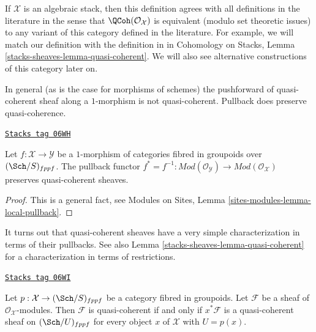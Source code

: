 If $\mathcal{X}$ is an algebraic stack, then this definition agrees with all
definitions in the literature in the sense that $\QCoh(\mathcal{O}_\mathcal{X})$
is equivalent (modulo set theoretic issues) to any variant of this category
defined in the literature. For example, we will match our definition with
the definition in \cite[Definition 6.1]{olsson_sheaves} in
Cohomology on Stacks, Lemma \ref{stacks-sheaves-lemma-quasi-coherent}.
We will also see alternative constructions of this category later on.

\medskip\noindent
In general (as is the case for morphisms of schemes) the pushforward
of quasi-coherent sheaf along a $1$-morphism is not quasi-coherent.
Pullback does preserve quasi-coherence.

\begin{lemma}
\label{stacks-sheaves-lemma-pullback-quasi-coherent}
\href{https://stacks.math.columbia.edu/tag/06WH}{\texttt{Stacks tag 06WH}}

Let $f : \mathcal{X} \to \mathcal{Y}$ be a $1$-morphism of categories
fibred in groupoids over $(\Sch/S)_{fppf}$.
The pullback functor
$f^* = f^{-1} : \textit{Mod}(\mathcal{O}_\mathcal{Y}) \to
\textit{Mod}(\mathcal{O}_\mathcal{X})$
preserves quasi-coherent sheaves.
\end{lemma}

\begin{proof}
This is a general fact, see
Modules on Sites, Lemma \ref{sites-modules-lemma-local-pullback}.
\end{proof}

It turns out that quasi-coherent sheaves have a very simple
characterization in terms of their pullbacks. See also
Lemma \ref{stacks-sheaves-lemma-quasi-coherent}
for a characterization in terms of restrictions.

\begin{lemma}
\label{stacks-sheaves-lemma-characterize-quasi-coherent}
\href{https://stacks.math.columbia.edu/tag/06WI}{\texttt{Stacks tag 06WI}}

Let $p : \mathcal{X} \to (\Sch/S)_{fppf}$ be a category
fibred in groupoids. Let $\mathcal{F}$
be a sheaf of $\mathcal{O}_\mathcal{X}$-modules. Then $\mathcal{F}$
is quasi-coherent if and only if $x^*\mathcal{F}$ is a quasi-coherent
sheaf on $(\Sch/U)_{fppf}$ for every object $x$ of
$\mathcal{X}$ with $U = p(x)$.
\end{lemma}

